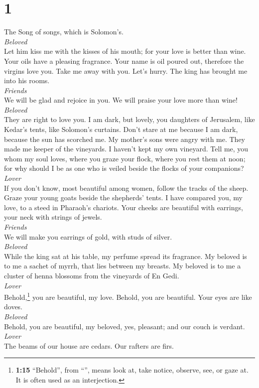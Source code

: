 \hypertarget{section}{%
\section{1}\label{section}}

 The Song of songs, which is Solomon's.\\
\emph{Beloved}\\
 Let him kiss me with the kisses of his mouth; for your
love is better than wine.  Your oils have a pleasing
fragrance. Your name is oil poured out, therefore the virgins love you.
 Take me away with you. Let's hurry. The king has brought
me into his rooms.\\
\emph{Friends}\\
We will be glad and rejoice in you. We will praise your love more than
wine!\\
\emph{Beloved}\\
They are right to love you.  I am dark, but lovely, you
daughters of Jerusalem, like Kedar's tents, like Solomon's curtains.
 Don't stare at me because I am dark, because the sun has
scorched me. My mother's sons were angry with me. They made me keeper of
the vineyards. I haven't kept my own vineyard.  Tell me,
you whom my soul loves, where you graze your flock, where you rest them
at noon; for why should I be as one who is veiled beside the flocks of
your companions?\\
\emph{Lover}\\
 If you don't know, most beautiful among women, follow the
tracks of the sheep. Graze your young goats beside the shepherds' tents.
 I have compared you, my love, to a steed in Pharaoh's
chariots.  Your cheeks are beautiful with earrings, your
neck with strings of jewels.\\
\emph{Friends}\\
 We will make you earrings of gold, with studs of
silver.\\
\emph{Beloved}\\
 While the king sat at his table, my perfume spread its
fragrance.  My beloved is to me a sachet of myrrh, that
lies between my breasts.  My beloved is to me a cluster
of henna blossoms from the vineyards of En Gedi.\\
\emph{Lover}\\
 Behold,\footnote{\textbf{1:15} ``Behold'', from
  ``'', means look at, take notice, observe, see, or gaze
  at. It is often used as an interjection.} you are beautiful, my love.
Behold, you are beautiful. Your eyes are like doves.\\
\emph{Beloved}\\
 Behold, you are beautiful, my beloved, yes, pleasant;
and our couch is verdant.\\
\emph{Lover}\\
 The beams of our house are cedars. Our rafters are firs.

